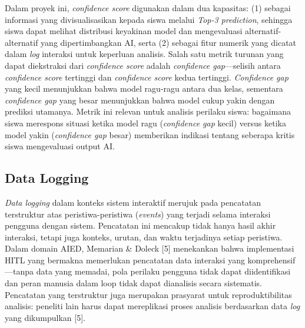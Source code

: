 Dalam proyek ini, \textit{confidence score} digunakan dalam dua kapasitas: (1) sebagai informasi yang divisualisasikan kepada siswa melalui \textit{Top-3 prediction}, sehingga siswa dapat melihat distribusi keyakinan model dan mengevaluasi alternatif-alternatif yang dipertimbangkan AI, serta (2) sebagai fitur numerik yang dicatat dalam \textit{log} interaksi untuk keperluan analisis. Salah satu metrik turunan yang dapat diekstraksi dari \textit{confidence score} adalah \textit{confidence gap}—selisih antara \textit{confidence score} tertinggi dan \textit{confidence score} kedua tertinggi. \textit{Confidence gap} yang kecil menunjukkan bahwa model ragu-ragu antara dua kelas, sementara \textit{confidence gap} yang besar menunjukkan bahwa model cukup yakin dengan prediksi utamanya. Metrik ini relevan untuk analisis perilaku siswa: bagaimana siswa merespons situasi ketika model ragu (\textit{confidence gap} kecil) versus ketika model yakin (\textit{confidence gap} besar) memberikan indikasi tentang seberapa kritis siswa mengevaluasi output AI.

\subsection{Data Logging}
\label{subsec:data-logging}

\textit{Data logging} dalam konteks sistem interaktif merujuk pada pencatatan terstruktur atas peristiwa-peristiwa (\textit{events}) yang terjadi selama interaksi pengguna dengan sistem. Pencatatan ini mencakup tidak hanya hasil akhir interaksi, tetapi juga konteks, urutan, dan waktu terjadinya setiap peristiwa. Dalam domain AIED, Memarian \& Doleck [5] menekankan bahwa implementasi HITL yang bermakna memerlukan pencatatan data interaksi yang komprehensif—tanpa data yang memadai, pola perilaku pengguna tidak dapat diidentifikasi dan peran manusia dalam loop tidak dapat dianalisis secara sistematis. Pencatatan yang terstruktur juga merupakan prasyarat untuk reproduktibilitas analisis: peneliti lain harus dapat mereplikasi proses analisis berdasarkan data \textit{log} yang dikumpulkan [5].

